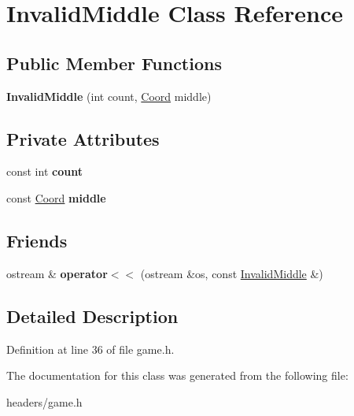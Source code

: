 \hypertarget{classInvalidMiddle}{\section{Invalid\+Middle Class Reference}
\label{classInvalidMiddle}
}
\subsection*{Public Member Functions}
\begin{DoxyCompactItemize}
\item 
\hypertarget{classInvalidMiddle_a9f95b57852f768294ff41b7b4d6504fc}{{\bfseries Invalid\+Middle} (int count, \hyperlink{structCoord}{Coord} middle)}\label{classInvalidMiddle_a9f95b57852f768294ff41b7b4d6504fc}

\end{DoxyCompactItemize}
\subsection*{Private Attributes}
\begin{DoxyCompactItemize}
\item 
\hypertarget{classInvalidMiddle_a0b3895584a08100d6993c06927a6aa47}{const int {\bfseries count}}\label{classInvalidMiddle_a0b3895584a08100d6993c06927a6aa47}

\item 
\hypertarget{classInvalidMiddle_a2b7ea531d435c0229ef911d8abe91022}{const \hyperlink{structCoord}{Coord} {\bfseries middle}}\label{classInvalidMiddle_a2b7ea531d435c0229ef911d8abe91022}

\end{DoxyCompactItemize}
\subsection*{Friends}
\begin{DoxyCompactItemize}
\item 
\hypertarget{classInvalidMiddle_a82776417931d3f6f2fdc00584390e12d}{ostream \& {\bfseries operator$<$$<$} (ostream \&os, const \hyperlink{classInvalidMiddle}{Invalid\+Middle} \&)}\label{classInvalidMiddle_a82776417931d3f6f2fdc00584390e12d}

\end{DoxyCompactItemize}


\subsection{Detailed Description}


Definition at line 36 of file game.\+h.



The documentation for this class was generated from the following file\+:\begin{DoxyCompactItemize}
\item 
headers/game.\+h\end{DoxyCompactItemize}
